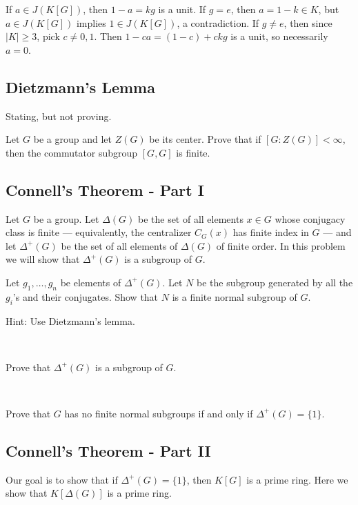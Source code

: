 \begin{pf}
	If $a\in J(K[G])$, then $1-a=kg$ is a unit.
	If $g=e$, then $a=1-k\in K$, but $a\in J(K[G])$ implies $1\in J(K[G])$,
	a contradiction.
	If $g\neq e$, then since $|K|\geq3$, pick $c\neq0,1$.
	Then $1-ca=(1-c)+ckg$ is a unit, so necessarily $a=0$.
\end{pf}


\newpage
\subsection{Dietzmann's Lemma}
Stating, but not proving.

\begin{lm}
	Let $G$ be a group and let $Z(G)$ be its center.
	Prove that if $[G:Z(G)]<\infty$,
	then the commutator subgroup $[G,G]$ is finite.
\end{lm}


\newpage
\subsection{Connell's Theorem - Part I}
Let $G$ be a group.
Let $\Delta(G)$ be the set of all elements $x\in G$ whose conjugacy class is finite ---
equivalently, the centralizer $C_G(x)$ has finite index in $G$ ---
and let $\Delta^+(G)$ be the set of all elements of $\Delta(G)$ of finite order.
In this problem we will show that $\Delta^+(G)$ is a subgroup of $G$.

\begin{exr}
	Let $g_1,\ldots,g_n$ be elements of $\Delta^+(G)$.
	Let $N$ be the subgroup generated by all the $g_i$'s and their conjugates.
	Show that $N$ is a finite normal subgroup of $G$.

	Hint: Use Dietzmann's lemma.
\end{exr} \

\begin{exr}
	Prove that $\Delta^+(G)$ is a subgroup of $G$.
\end{exr} \

\begin{exr}
	Prove that $G$ has no finite normal subgroups if and only if $\Delta^+(G)=\{1\}$.
\end{exr}


\newpage
\subsection{Connell's Theorem - Part II}
Our goal is to show that if $\Delta^+(G)=\{1\}$, then $K[G]$ is a prime ring.
Here we show that $K[\Delta(G)]$ is a prime ring.


